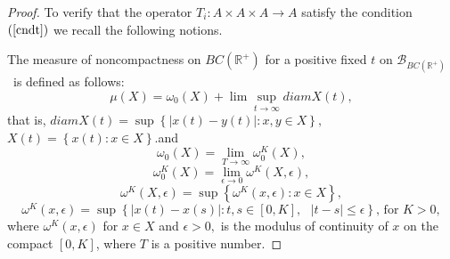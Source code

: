 \documentclass{amsart}
\theoremstyle{plain}
\numberwithin{equation}{section}
\begin{document}
\begin{proof}
To verify that the operator $T_{i}:A\times A\times A\rightarrow A$ satisfy
the condition $\left( \text{\ref{cndt}}\right) $ we recall the following
notions.

The measure of noncompactness on $BC\left( \mathbb{R}^{+}\right) $ for a
positive fixed $t$ on $\mathcal{B}_{BC\left( \mathbb{R}^{+}\right) }$\ is
defined as follows:\begin{equation*}
\mu \left( X\right) =\omega _{0}\left( X\right) +\lim \sup_{t\rightarrow
\infty }diamX\left( t\right) ,
\end{equation*}that is, $diamX\left( t\right) =\sup \left\{ \left\vert x\left( t\right)
-y\left( t\right) \right\vert :x,y\in X\right\} ,$ $X\left( t\right)
=\left\{ x\left( t\right) :x\in X\right\} .$and 
\begin{equation*}
\omega _{0}\left( X\right) =\lim_{T\rightarrow \infty }\omega _{0}^{K}\left(
X\right) ,
\end{equation*}\begin{equation*}
\omega _{0}^{K}\left( X\right) =\lim_{\epsilon \rightarrow 0}\omega
^{K}\left( X,\epsilon \right) ,
\end{equation*}\begin{equation*}
\omega ^{K}\left( X,\epsilon \right) =\sup \left\{ \omega ^{K}\left(
x,\epsilon \right) :x\in X\right\} ,
\end{equation*}\begin{equation*}
\omega ^{K}\left( x,\epsilon \right) =\sup \left\{ \left\vert x\left(
t\right) -x\left( s\right) \right\vert :t,s\in \left[ 0,K\right] ,\text{ }\left\vert t-s\right\vert \leqslant \epsilon \right\} \text{, for }K>0,
\end{equation*}where $\omega ^{K}\left( x,\epsilon \right) $ for $x\in X$ and $\epsilon >0,$
is the modulus of continuity of $x$ on the compact $\left[ 0,K\right] $,
where $T$ is a positive number.


\end{proof}
\end{document}
